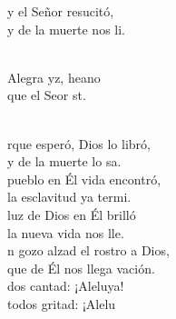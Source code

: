 \begin{cancion}%
	y el Señor resucitó,\\
	y de la muerte nos li. \\\jump\\
	\begin{chorus}%
	Alegra yz, heano\\
	que el Seor st.\\
	\end{chorus}%
	\jump\\
	rque esperó, Dios lo libró,\\
	y de la muerte lo sa.\\
	 pueblo en Él vida encontró,\\
	la esclavitud ya termi.\\
	 luz de Dios en Él brilló\\
	la nueva vida nos lle.\\
	n gozo alzad el rostro a Dios,\\
	que de Él nos llega vación.\\
	dos cantad: ¡Aleluya!\\
	todos gritad: ¡Alelu\\
\end{cancion}%
